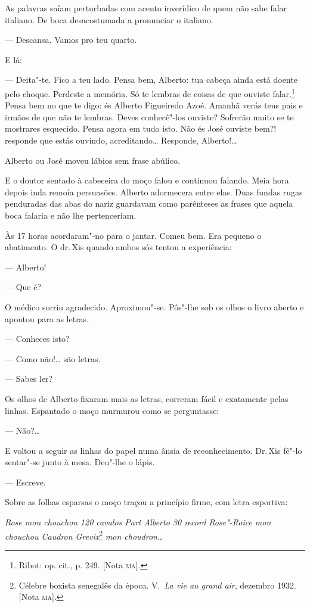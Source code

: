 As palavras saíam perturbadas com acento inverídico de quem não sabe
falar italiano. De boca desacostumada a pronunciar o italiano.

--- Descansa. Vamos pro teu quarto.

E lá:

--- Deita"-te. Fico a teu lado. Pensa bem, Alberto: tua cabeça ainda está
doente pelo choque. Perdeste a memória. Só te lembras de coisas de que
ouviste falar.\footnote{Ribot: op. cit., p. 249. {[}Nota \textsc{ma}{]}.} Pensa
bem no que te digo: és Alberto Figueiredo Azoé. Amanhã verás teus pais e
irmãos de que não te lembras. Deves conhecê"-los ouviste? Sofrerão muito
se te mostrares esquecido. Pensa agora em tudo isto. Não és José ouviste
bem?! responde que estás ouvindo, acreditando\ldots{} Responde, Alberto!\ldots{}

Alberto ou José moveu lábios sem frase abúlico.

E o doutor sentado à cabeceira do moço falou e continuou falando. Meia
hora depois inda remoía persuasões. Alberto adormecera entre elas. Duas
fundas rugas penduradas das abas do nariz guardavam como parênteses as
frases que aquela boca falaria e não lhe pertenceriam.

Às 17 horas acordaram"-no para o jantar. Comeu bem. Era pequeno o
abatimento. O dr.\,Xis quando ambos sós tentou a experiência:

--- Alberto!

--- Que é?

O médico sorriu agradecido. Aproximou"-se. Pôs"-lhe sob os olhos o livro
aberto e apontou para as letras.

--- Conheces isto?

--- Como não!\ldots{} são letras.

--- Sabes ler?

Os olhos de Alberto fixaram mais as letras, correram fácil e exatamente
pelas linhas. Espantado o moço murmurou como se perguntasse:

--- Não?\ldots{}

E voltou a seguir as linhas do papel numa ânsia de reconhecimento. Dr.\,Xis fê"-lo sentar"-se junto à mesa. Deu"-lhe o lápis.

--- Escreve.

Sobre as folhas esparsas o moço traçou a princípio firme, com letra
esportiva:

\emph{Rose mon chouchou 120 cavalos Part Alberto 30 record Rose"-Roice
mon chouchou Caudron Grevix}\footnote{Célebre boxista senegalês da
  época. V.~\emph{La vie au grand air}, dezembro 1932. {[}Nota \textsc{ma}{]}.}
\emph{mon choudron\ldots{}}

